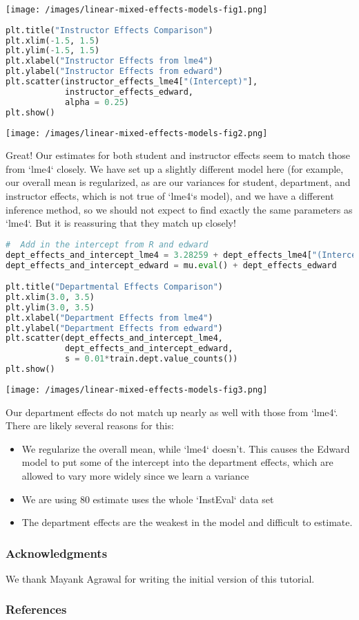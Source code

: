 \texttt{[image: /images/linear-mixed-effects-models-fig1.png]}

\begin{lstlisting}[language=Python]
plt.title("Instructor Effects Comparison")
plt.xlim(-1.5, 1.5)
plt.ylim(-1.5, 1.5)
plt.xlabel("Instructor Effects from lme4")
plt.ylabel("Instructor Effects from edward")
plt.scatter(instructor_effects_lme4["(Intercept)"],
            instructor_effects_edward,
            alpha = 0.25)
plt.show()
\end{lstlisting}

\texttt{[image: /images/linear-mixed-effects-models-fig2.png]}

Great!  Our estimates for both student and instructor effects seem to
match those from `lme4` closely.  We have set up a slightly different
model here (for example, our overall mean is regularized, as are our
variances for student, department, and instructor effects, which is not
true of `lme4`s model), and we have a different inference method, so we
should not expect to find exactly the same parameters as `lme4`.  But
it is reassuring that they match up closely!

\begin{lstlisting}[language=Python]
#  Add in the intercept from R and edward
dept_effects_and_intercept_lme4 = 3.28259 + dept_effects_lme4["(Intercept)"]
dept_effects_and_intercept_edward = mu.eval() + dept_effects_edward

plt.title("Departmental Effects Comparison")
plt.xlim(3.0, 3.5)
plt.ylim(3.0, 3.5)
plt.xlabel("Department Effects from lme4")
plt.ylabel("Department Effects from edward")
plt.scatter(dept_effects_and_intercept_lme4,
            dept_effects_and_intercept_edward,
            s = 0.01*train.dept.value_counts())
plt.show()
\end{lstlisting}

\texttt{[image: /images/linear-mixed-effects-models-fig3.png]}

Our department effects do not match up nearly as well with those from `lme4`.
There are likely several reasons for this:

\begin{itemize}
\item
  We regularize the overall mean, while `lme4` doesn't. This causes the
  Edward model to put some of the intercept into the department effects,
  which are allowed to vary more widely since we learn a variance
\item
  We are using 80%
  estimate uses the whole `InstEval` data set
\item
  The department effects are the weakest in the model and difficult to
  estimate.
\end{itemize}

\subsubsection{Acknowledgments}

We thank Mayank Agrawal for writing the initial version of this
tutorial.

\subsubsection{References}\label{references}
